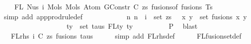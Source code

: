 \begin{isabellebody}
\ \ \ \ FL\ {\isacharparenleft}{\kern0pt}Nus{}\ i\ {\isacharparenleft}{\kern0pt}Mols{}\ {\isacharparenleft}{\kern0pt}Mols{}\ {\isacharparenleft}{\kern0pt}Atom\ {\isacharparenleft}{\kern0pt}GConstr\ C{\isacharparenright}{\kern0pt}\ zs{\isacharparenright}{\kern0pt}\ {\isacharparenleft}{\kern0pt}fusions{\isacharunderscore}{\kern0pt}of\ fusions{\isacharparenright}{\kern0pt}{\isacharparenright}{\kern0pt}\ Ts{\isacharparenright}{\kern0pt}{\isacharparenright}{\kern0pt}{\isachardoublequoteclose}\isanewline
\ \ \ \ \isamarkupfalse%
\ {\isacharparenleft}{\kern0pt}simp\ add{\isacharcolon}{\kern0pt}\ app{\isacharunderscore}{\kern0pt}prodrule{\isacharunderscore}{\kern0pt}def{\isacharparenright}{\kern0pt}\isanewline
\ \ \isamarkupfalse%
\ \isamarkupfalse%
\ {\isachardoublequoteopen}{\isachardot}{\kern0pt}{\isachardot}{\kern0pt}{\isachardot}{\kern0pt}\ {\isacharequal}{\kern0pt}\isanewline
\ \ \ \ \ {\isacharbraceleft}{\kern0pt}n{\isachardot}{\kern0pt}\ n\ {\isacharplus}{\kern0pt}\ i\ {\isasymin}\ set\ zs\ {\isasymunion}\ {\isacharparenleft}{\kern0pt}{\isasymUnion}\ {\isacharparenleft}{\kern0pt}x{\isacharcomma}{\kern0pt}\ y{\isacharparenright}{\kern0pt}\ {\isasymin}\ set\ fusions{\isachardot}{\kern0pt}\ {\isacharbraceleft}{\kern0pt}x{\isacharcomma}{\kern0pt}\ y{\isacharbraceright}{\kern0pt}{\isacharparenright}{\kern0pt}\isanewline
\ \ \ \ \ \ \ \ \ \ \ \ \ \ \ \ \ {\isasymunion}\ {\isacharparenleft}{\kern0pt}{\isasymUnion}\ ty\ {\isasymin}\ set\ taus{\isachardot}{\kern0pt}\ FLty\ ty{\isacharparenright}{\kern0pt}{\isacharbraceright}{\kern0pt}{\isachardoublequoteclose}\isanewline
\ \ \ \ \ \ \ \ \isamarkupfalse%
\ P{}{}\ \isamarkupfalse%
\ blast\isanewline
\ \ \isamarkupfalse%
\ \isamarkupfalse%
\ {\isachardoublequoteopen}{\isachardot}{\kern0pt}{\isachardot}{\kern0pt}{\isachardot}{\kern0pt}\ {\isacharequal}{\kern0pt}\ FLrhs\ {\isacharparenleft}{\kern0pt}i{\isacharcomma}{\kern0pt}\ {\isacharparenleft}{\kern0pt}C{\isacharcomma}{\kern0pt}\ zs{\isacharparenright}{\kern0pt}{\isacharcomma}{\kern0pt}\ fusions{\isacharcomma}{\kern0pt}\ taus{\isacharparenright}{\kern0pt}{\isachardoublequoteclose}\isanewline
\ \ \ \ \isamarkupfalse%
\ {\isacharparenleft}{\kern0pt}simp\ add{\isacharcolon}{\kern0pt}\ FLrhs{\isacharunderscore}{\kern0pt}def{\isacharparenright}{\kern0pt}\isanewline
\ \ \ \ \isamarkupfalse%
\ FLfusion{\isacharunderscore}{\kern0pt}set{\isacharunderscore}{\kern0pt}def\ \isamarkupfalse%

\end{isabellebody}
